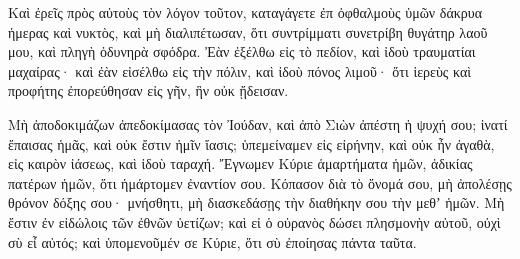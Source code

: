 {\par }{\PP {}Καὶ ἐρεῖς πρὸς αὐτοὺς τὸν λόγον τοῦτον, καταγάγετε ἐπ ὀφθαλμοὺς ὑμῶν δάκρυα ἡμερας καὶ νυκτὸς, καὶ μὴ διαλιπέτωσαν, ὅτι συντρίμματι συνετρίβη θυγάτηρ λαοῦ μου, καὶ πληγὴ ὀδυνηρὰ σφόδρα.
Ἐὰν ἐξέλθω εἰς τὸ πεδίον, καὶ ἰδοὺ τραυματίαι μαχαίρας· καὶ ἐὰν εἰσέλθω εἰς τὴν πόλιν, καὶ ἰδοὺ πόνος λιμοῦ· ὅτι ἱερεὺς καὶ προφήτης ἐπορεύθησαν εἰς γῆν, ἣν οὐκ ᾔδεισαν.
\par }{\PP {}Μὴ ἀποδοκιμάζων ἀπεδοκίμασας τὸν Ἰούδαν, καὶ ἀπὸ Σιὼν ἀπέστη ἡ ψυχή σου; ἱνατί ἔπαισας ἡμᾶς, καὶ οὐκ ἔστιν ἡμῖν ἴασις; ὑπεμείναμεν εἰς εἰρήνην, καὶ οὐκ ἦν ἀγαθὰ, εἰς καιρὸν ἰάσεως, καὶ ἰδοὺ ταραχή.
Ἔγνωμεν Κύριε ἁμαρτήματα ἡμῶν, ἀδικίας πατέρων ἡμῶν, ὅτι ἡμάρτομεν ἐναντίον σου.
Κόπασον διὰ τὸ ὄνομά σου, μὴ ἀπολέσῃς θρόνον δόξης σου· μνήσθητι, μὴ διασκεδάσῃς τὴν διαθήκην σου τὴν μεθʼ ἡμῶν.
Μὴ ἔστιν ἐν εἰδώλοις τῶν ἐθνῶν ὑετίζων; καὶ εἰ ὁ οὐρανὸς δώσει πλησμονὴν αὐτοῦ, οὐχὶ σὺ εἶ αὐτός; καὶ ὑπομενοῦμέν σε Κύριε, ὅτι σὺ ἐποίησας πάντα ταῦτα.

}
